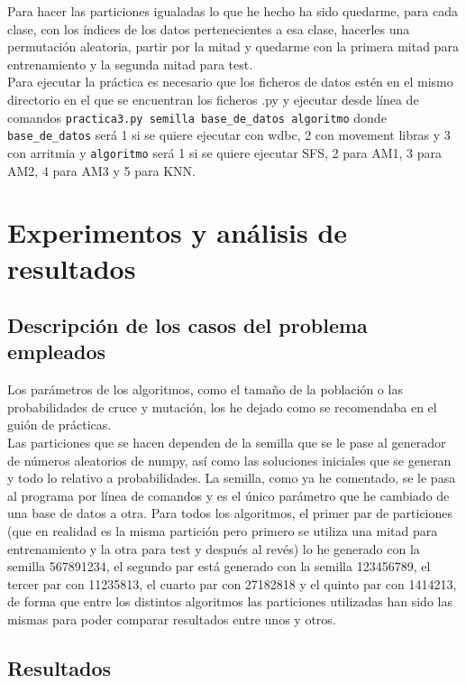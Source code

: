 \documentclass[12pt]{article}
\begin{document}
Para hacer las particiones igualadas lo que he hecho ha sido quedarme, para cada clase, con los índices de los datos pertenecientes a esa clase, hacerles una permutación aleatoria, partir por la mitad y quedarme con la primera mitad para entrenamiento y la segunda mitad para test.\\

Para ejecutar la práctica es necesario que los ficheros de datos estén en el mismo directorio en el que se encuentran los ficheros .py y ejecutar desde línea de comandos \texttt{practica3.py semilla base\_de\_datos algoritmo} donde \texttt{base\_de\_datos} será 1 si se quiere ejecutar con wdbc, 2 con movement libras y 3 con arritmia y \texttt{algoritmo} será 1 si se quiere ejecutar SFS, 2 para AM1, 3 para AM2, 4 para AM3 y 5 para KNN.

\newpage

\section{Experimentos y análisis de resultados}
\subsection{Descripción de los casos del problema empleados}

Los parámetros de los algoritmos, como el tamaño de la población o las probabilidades de cruce y mutación, los he dejado como se recomendaba en el guión de prácticas.\\
Las particiones que se hacen dependen de la semilla que se le pase al generador de números aleatorios de numpy, así como las soluciones iniciales que se generan y todo lo relativo a probabilidades. La semilla, como ya he comentado, se le pasa al programa por línea de comandos y es el único parámetro que he cambiado de una base de datos a otra. Para todos los algoritmos, el primer par de particiones (que en realidad es la misma partición pero primero se utiliza una mitad para entrenamiento y la otra para test y después al revés) lo he generado con la semilla 567891234, el segundo par está generado con la semilla 123456789, el tercer par con 11235813, el cuarto par con 27182818 y el quinto par con 1414213, de forma que entre los distintos algoritmos las particiones utilizadas han sido las mismas para poder comparar resultados entre unos y otros.

\subsection{Resultados}
\end{document}
